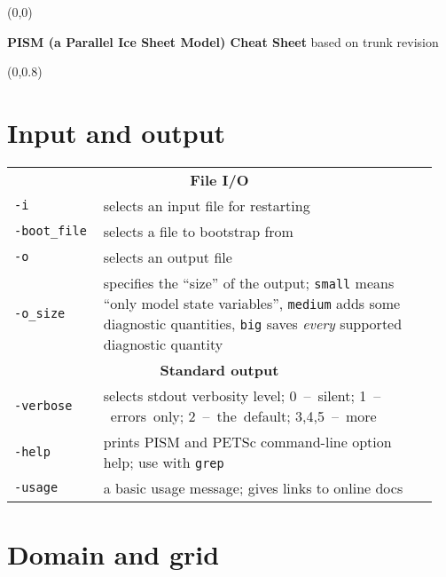 \documentclass[landscape]{article}
\newcommand{\PISMREV}{trunk revision }
\newcommand{\tabletitle}[1]{\multicolumn{2}{c}{\textbf{#1}}}
\begin{document}
\pagestyle{empty}

\begin{textblock}{47}(0,0)
  \begin{center}
    \Large{\textbf{PISM (a Parallel Ice Sheet Model) Cheat Sheet} based on \PISMREV}
  \end{center}
\end{textblock}

\begin{textblock}{15}(0,0.8)
\section{Input and output}
\label{sec:input-output}

\begin{tabular}{@{}p{0.2\linewidth}p{0.75\linewidth}@{}}
\tabletitle{File I/O} \\
\texttt{-i} & selects an input file for restarting \\
\texttt{-boot_file} & selects a file to bootstrap from \\
\texttt{-o} & selects an output file \\
\texttt{-o_size} & specifies the ``size'' of the output; \texttt{small} means
``only model state variables'', \texttt{medium} adds some
diagnostic quantities, \texttt{big} saves \emph{every} supported diagnostic quantity\\
\tabletitle{Standard output} \\
\texttt{-verbose} & selects stdout verbosity level; \mbox{0 -- silent}; \mbox{1 --
errors only}; \mbox{2 -- the default}; \mbox{3,4,5 -- more}\\
\texttt{-help} & prints PISM and PETSc command-line option help; use with \texttt{grep}\\
\texttt{-usage} & a basic usage message; gives links to online docs\\
\end{tabular}

\section{Domain and grid}
\label{sec:grid-setup}
  

\end{textblock}
\end{document}
